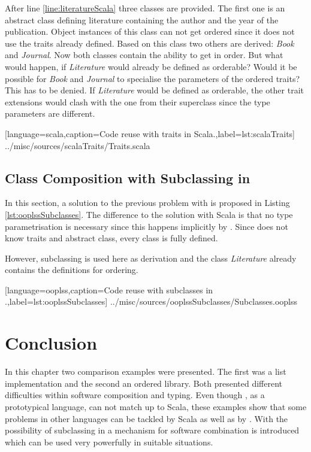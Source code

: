 After line \ref{line:literatureScala} three classes are provided. The
first one is an abstract class defining literature containing the author
and the year of the publication. Object instances of this class can not
get ordered since it does not use the traits already defined. Based on
this class two others are derived: \emph{Book} and \emph{Journal}. Now
both classes contain the ability to get in order. But what would happen,
if \emph{Literature} would already be defined as orderable? Would it be
possible for \emph{Book} and \emph{Journal} to specialise the parameters
of the ordered traits? This has to be denied. If \emph{Literature} would
be defined as orderable, the other trait extensions would clash with
the one from their superclass since the type parameters are different.

\newpage

[language=scala,caption=Code reuse with traits in Scala.,label=lst:scalaTraits]
{../misc/sources/scalaTraits/Traits.scala}

\subsection{Class Composition with Subclassing in \ooplss}
In this section, a solution to the previous problem with \ooplss is proposed in Listing
\ref{lst:ooplssSubclasses}. The difference to the solution with
Scala is that no type parametrisation is necessary since this happens
implicitly by \mytype. Since \ooplss does not know traits and abstract
class, every class is fully defined.

However, subclassing is used here as derivation and the class
\emph{Literature} already contains the definitions for ordering.


[language=ooplss,caption=Code reuse with subclasses in \ooplss.,label=lst:ooplssSubclasses]
{../misc/sources/ooplssSubclasses/Subclasses.ooplss}

\section{Conclusion}
In this chapter two comparison examples were presented. The first was a
list implementation and the second an ordered library. Both presented
different difficulties within software composition and typing. Even
though \ooplss, as a prototypical language, can not match up to Scala,
these examples show that some problems in other languages can be tackled
by Scala as well as by \ooplss. With the possibility of subclassing in
\ooplss a mechanism for software combination is introduced which can be
used very powerfully in suitable situations.
